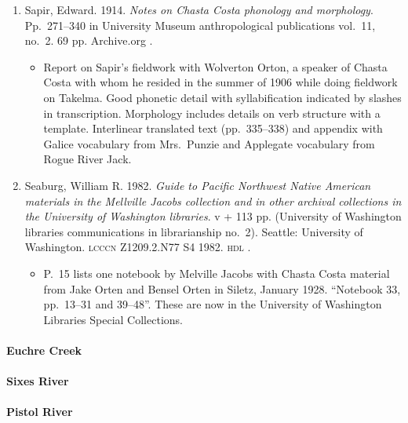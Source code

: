 \documentclass[12pt,letterpaper,oneside,article]{memoir}
\begin{document}
\begin{enumerate}
\item	Sapir, Edward.
	1914.
	\textit{Notes on Chasta Costa phonology and morphology}.
	Pp.\ 271–340 in University Museum anthropological publications vol.\ 11, no.\ 2.
	69 pp.
	Archive.org .
	\begin{itemize}
	\item	Report on Sapir’s fieldwork with Wolverton Orton, a speaker of Chasta Costa
		with whom he resided in the summer of 1906 while doing fieldwork on Takelma.
		Good phonetic detail with syllabification indicated by slashes in transcription.
		Morphology includes details on verb structure with a template.
		Interlinear translated text (pp.\ 335–338) and appendix with Galice vocabulary
		from Mrs.\ Punzie and Applegate vocabulary from Rogue River Jack.
	\end{itemize}
\item	Seaburg, William R.
	1982.
	\textit{Guide to Pacific Northwest Native American materials in the Mellville Jacobs
		collection and in other archival collections in the University of Washington
		libraries}.
	v + 113 pp.
	(University of Washington libraries communications in librarianship no.\ 2).
	Seattle: University of Washington.
	\textsc{lcccn} Z1209.2.N77 S4 1982.
	\textsc{hdl} .
	\begin{itemize}
	\item	P.\ 15 lists one notebook by Melville Jacobs with Chasta Costa material
		from Jake Orten and Bensel Orten in Siletz, January 1928.
		“Notebook 33, pp.\ 13–31 and 39–48”.
		These are now in the University of Washington Libraries Special Collections.
	\end{itemize}
\end{enumerate}

\paragraph{Euchre Creek}\label{sec:euchrecreek}

\paragraph{Sixes River}\label{sec:sixesriver}

\paragraph{Pistol River}\label{sec:pistolriver}
\end{document}
